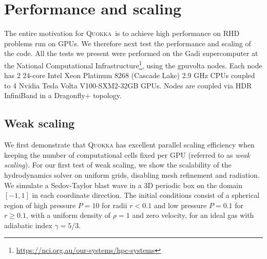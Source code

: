 \documentclass[fleqn,usenatbib]{mnras}
\newcommand{\quokka}{\textsc{Quokka}}
\begin{document}
\section{Performance and scaling}
The entire motivation for \quokka~is to achieve high performance on RHD problems run on GPUs. We therefore next test the performance and scaling of the code. All the tests we present were performed on the Gadi supercomputer at the National Computational Infrastructure\footnote{\url{https://nci.org.au/our-systems/hpc-systems}}, using the gpuvolta nodes. Each node has 2 24-core Intel Xeon Platinum 8268 (Cascade Lake) 2.9 GHz CPUs coupled to 4 Nvidia Tesla Volta V100-SXM2-32GB GPUs. Nodes are coupled via HDR InfiniBand in a Dragonfly+ topology.

\label{section:performance}
\subsection{Weak scaling}
We first demonstrate that \textsc{Quokka} has excellent parallel scaling efficiency when keeping the number of computational cells fixed per GPU (referred to as \emph{weak scaling}). For our first test of weak scaling, we show the scalability of the hydrodynamics solver on uniform grids, disabling mesh refinement and radiation. We simulate a Sedov-Taylor blast wave \citep{Sedov_1959,Taylor_1946} in a 3D periodic box on the domain $[-1, 1]$ in each coordinate direction. The initial conditions consist of a spherical region of high pressure $P = 10$ for radii $r < 0.1$ and low pressure $P = 0.1$ for $r \ge 0.1$, with a uniform density of $\rho = 1$ and zero velocity, for an ideal gas with adiabatic index $\gamma = 5/3$.
\end{document}
